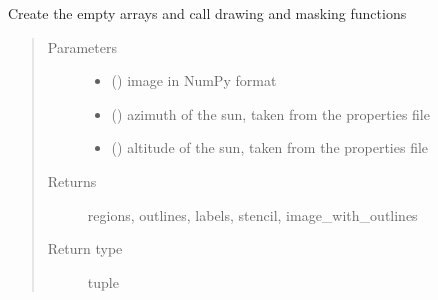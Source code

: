 \documentclass[letterpaper,10pt,english]{sphinxmanual}
\begin{document}
\begin{fulllineitems}
\label{\detokenize{createregions:createregions.create}}
Create the empty arrays and call drawing and masking functions
\begin{quote}\begin{description}
\item[{Parameters}] \leavevmode\begin{itemize}
\item {} 
 () \textendash{} image in NumPy format

\item {} 
 () \textendash{} azimuth of the sun, taken from the properties file

\item {} 
 () \textendash{} altitude of the sun, taken from the properties file

\end{itemize}

\item[{Returns}] \leavevmode
regions, outlines, labels, stencil, image\_with\_outlines

\item[{Return type}] \leavevmode
tuple

\end{description}\end{quote}

\end{fulllineitems}

\end{document}
